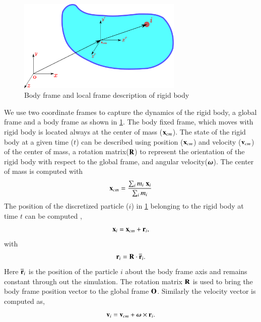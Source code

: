 \begin{figure}[!htpb]
  \centering
  \includegraphics[width=0.7\textwidth]{images/rfc/images/rigid_body/rigid_body}
  \caption{Body frame and local frame description of rigid body}
  \label{fig:gloabl_body_frame_rb}
\end{figure}
We use two coordinate frames to capture the dynamics of the rigid body, a
global frame and a body frame as shown in
\cref{fig:gloabl_body_frame_rb}. The body fixed frame, which moves with
rigid body is located always at the center of mass ($\mathbf{x}_{cm}$). The
state of the rigid body at a given time ($t$) can be described using position
($\mathbf{x}_{cm}$) and velocity ($\mathbf{v}_{cm}$) of the center of mass, a
rotation matrix($\mathbf{R}$) to represent the orientation of the rigid body with
respect to the global frame, and angular velocity($\boldsymbol{\omega}$). The center
of mass is computed with
\begin{equation}
  \label{eq:center_of_mass}
  \mathbf{x}_{cm} = \frac{\sum_i m_i \; \mathbf{x}_{i} }{\sum_i m_i }
\end{equation}
The position of the discretized particle ($i$) in
\cref{fig:gloabl_body_frame_rb} belonging to the rigid body at time $t$ can be
computed ,
\begin{equation}
  \label{eq:rb_particle_pos_update}
  \mathbf{x}_i = \mathbf{x}_{cm} + \mathbf{r}_{i},
\end{equation}
with
\begin{equation}
  \label{eq:rb_particle_pos_update}
  \mathbf{r}_i = \mathbf{R} \cdot \overline{\mathbf{r}}_{i}.
\end{equation}
Here $\overline{\mathbf{r}}_{i}$ is the position of the particle $i$ about the body
frame axis and remains constant through out the simulation. The rotation matrix
$\mathbf{R}$ is used to bring the body frame position vector to the global frame
$\mathbf{O}$. Similarly the velocity vector is computed as,
\begin{equation}
  \label{eq:rb_particle_vel_update}
  \mathbf{v}_i = \mathbf{v}_{cm} + \boldsymbol{\omega} \times \mathbf{r}_{i}.
\end{equation}

